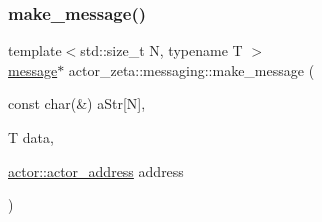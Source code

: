 \mbox{\label{namespaceactor__zeta_1_1messaging_acbb0a86110c3f12f5250dfc8f3df4861}} 
\subsubsection{\texorpdfstring{make\+\_\+message()}{make\_message()}\hspace{0.1cm}{\footnotesize\ttfamily [4/4]}}
{\footnotesize\ttfamily template$<$std\+::size\+\_\+t N, typename T $>$ \\
\hyperlink{classactor__zeta_1_1messaging_1_1message}{message}$\ast$ actor\+\_\+zeta\+::messaging\+::make\+\_\+message (\begin{DoxyParamCaption}\item[{const char(\&)}]{a\+Str\mbox{[}\+N\mbox{]},  }\item[{T}]{data,  }\item[{\hyperlink{classactor__zeta_1_1actor_1_1actor__address}{actor\+::actor\+\_\+address}}]{address }\end{DoxyParamCaption})\hspace{0.3cm}{\ttfamily [inline]}}

